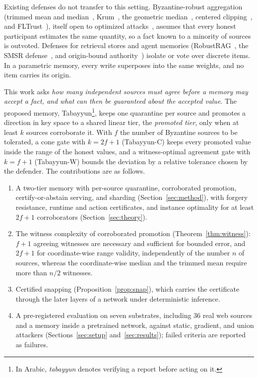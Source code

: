 \documentclass[journal]{IEEEtran}
\theoremstyle{remark}
\newcommand{\TabC}{\mbox{Tabayyun-C}}
\newcommand{\TabW}{\mbox{Tabayyun-W}}
\begin{document}
Existing defenses do not transfer to this setting. Byzantine-robust aggregation (trimmed mean and median~\cite{yin2018byzantine}, Krum~\cite{blanchard2017krum}, the geometric median~\cite{pillutla2022rfa}, centered clipping~\cite{karimireddy2021history}, and FLTrust~\cite{cao2021fltrust}), itself open to optimized attacks~\cite{fang2020local,baruch2019little,shejwalkar2021manipulating}, assumes that every honest participant estimates the same quantity, so a fact known to a minority of sources is outvoted. Defenses for retrieval stores and agent memories (RobustRAG~\cite{xiang2024robustrag}, the SMSR defense~\cite{sharma2026smsr}, and origin-bound authority~\cite{louck2026tma}) isolate or vote over discrete items. In a parametric memory, every write superposes into the same weights, and no item carries its origin.

This work asks \emph{how many independent sources must agree before a memory may accept a fact, and what can then be guaranteed about the accepted value}. The proposed memory, Tabayyun\footnote{In Arabic, \emph{tabayyun} denotes verifying a report before acting on it.}, keeps one quarantine per source and promotes a direction in key space to a shared linear tier, the \emph{promoted tier}, only when at least $k$ sources corroborate it. With $f$ the number of Byzantine sources to be tolerated, a cone gate with $k=2f+1$ (\TabC) keeps every promoted value inside the range of the honest values, and a witness-optimal agreement gate with $k=f+1$ (\TabW) bounds the deviation by a relative tolerance chosen by the defender. The contributions are as follows.
\begin{enumerate}
\item A two-tier memory with per-source quarantine, corroborated promotion, certify-or-abstain serving, and sharding (Section~\ref{sec:method}), with forgery resistance, runtime and action certificates, and instance optimality for at least $2f+1$ corroborators (Section~\ref{sec:theory}).
\item The witness complexity of corroborated promotion (Theorem~\ref{thm:witness}): $f+1$ agreeing witnesses are necessary and sufficient for bounded error, and $2f+1$ for coordinate-wise range validity, independently of the number $n$ of sources, whereas the coordinate-wise median and the trimmed mean require more than $n/2$ witnesses.
\item Certified snapping (Proposition~\ref{prop:snap}), which carries the certificate through the later layers of a network under deterministic inference.
\item A pre-registered evaluation on seven substrates, including 36 real web sources and a memory inside a pretrained network, against static, gradient, and union attackers (Sections~\ref{sec:setup} and~\ref{sec:results}); failed criteria are reported as failures.
\end{enumerate}
\end{document}
